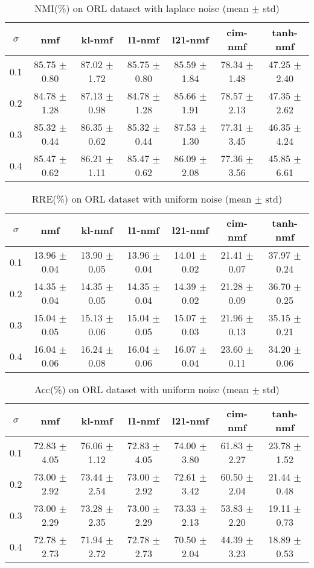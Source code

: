 \documentclass{article} %
\begin{document}
\begin{table}
\begin{tabular}{c|cccccc}$\sigma$ & nmf & kl-nmf & l1-nmf & l21-nmf & cim-nmf & tanh-nmf \\\hline
0.1 & 85.75 $\pm$ 0.80 & 87.02 $\pm$ 1.72 & 85.75 $\pm$ 0.80 & 85.59 $\pm$ 1.84 & 78.34 $\pm$ 1.48 & 47.25 $\pm$ 2.40 \\
0.2 & 84.78 $\pm$ 1.28 & 87.13 $\pm$ 0.98 & 84.78 $\pm$ 1.28 & 85.66 $\pm$ 1.91 & 78.57 $\pm$ 2.13 & 47.35 $\pm$ 2.62 \\
0.3 & 85.32 $\pm$ 0.44 & 86.35 $\pm$ 0.62 & 85.32 $\pm$ 0.44 & 87.53 $\pm$ 1.30 & 77.31 $\pm$ 3.45 & 46.35 $\pm$ 4.24 \\
0.4 & 85.47 $\pm$ 0.62 & 86.21 $\pm$ 1.11 & 85.47 $\pm$ 0.62 & 86.09 $\pm$ 2.08 & 77.36 $\pm$ 3.56 & 45.85 $\pm$ 6.61 \\
\end{tabular}\caption{
  NMI(\%) on ORL dataset with laplace noise (mean $\pm$ std)
  \label{tab:NMI-ORL-laplace}
}\end{table}
\begin{table}
\begin{tabular}{c|cccccc}$\sigma$ & nmf & kl-nmf & l1-nmf & l21-nmf & cim-nmf & tanh-nmf \\\hline
0.1 & 13.96 $\pm$ 0.04 & 13.90 $\pm$ 0.05 & 13.96 $\pm$ 0.04 & 14.01 $\pm$ 0.02 & 21.41 $\pm$ 0.07 & 37.97 $\pm$ 0.24 \\
0.2 & 14.35 $\pm$ 0.04 & 14.35 $\pm$ 0.05 & 14.35 $\pm$ 0.04 & 14.39 $\pm$ 0.02 & 21.28 $\pm$ 0.09 & 36.70 $\pm$ 0.25 \\
0.3 & 15.04 $\pm$ 0.05 & 15.13 $\pm$ 0.06 & 15.04 $\pm$ 0.05 & 15.07 $\pm$ 0.03 & 21.96 $\pm$ 0.13 & 35.15 $\pm$ 0.21 \\
0.4 & 16.04 $\pm$ 0.06 & 16.24 $\pm$ 0.08 & 16.04 $\pm$ 0.06 & 16.07 $\pm$ 0.04 & 23.60 $\pm$ 0.11 & 34.20 $\pm$ 0.06 \\
\end{tabular}\caption{
  RRE(\%) on ORL dataset with uniform noise (mean $\pm$ std)
  \label{tab:RRE-ORL-uniform}
}\end{table}
\begin{table}
\begin{tabular}{c|cccccc}$\sigma$ & nmf & kl-nmf & l1-nmf & l21-nmf & cim-nmf & tanh-nmf \\\hline
0.1 & 72.83 $\pm$ 4.05 & 76.06 $\pm$ 1.12 & 72.83 $\pm$ 4.05 & 74.00 $\pm$ 3.80 & 61.83 $\pm$ 2.27 & 23.78 $\pm$ 1.52 \\
0.2 & 73.00 $\pm$ 2.92 & 73.44 $\pm$ 2.54 & 73.00 $\pm$ 2.92 & 72.61 $\pm$ 3.42 & 60.50 $\pm$ 2.04 & 21.44 $\pm$ 0.48 \\
0.3 & 73.00 $\pm$ 2.29 & 73.28 $\pm$ 2.35 & 73.00 $\pm$ 2.29 & 73.33 $\pm$ 2.13 & 53.83 $\pm$ 2.20 & 19.11 $\pm$ 0.73 \\
0.4 & 72.78 $\pm$ 2.73 & 71.94 $\pm$ 2.72 & 72.78 $\pm$ 2.73 & 70.50 $\pm$ 2.04 & 44.39 $\pm$ 3.23 & 18.89 $\pm$ 0.53 \\
\end{tabular}\caption{
  Acc(\%) on ORL dataset with uniform noise (mean $\pm$ std)
  \label{tab:Acc-ORL-uniform}
}\end{table}
\end{document}
